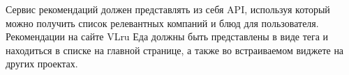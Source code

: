 Сервис рекомендаций должен представлять из себя API, используя который можно получить
список релевантных компаний и блюд для пользователя.
Рекомендации на сайте VLru Еда должны быть представлены в виде тега и находиться в
списке на главной странице, а также во встраиваемом виджете на других проектах.
